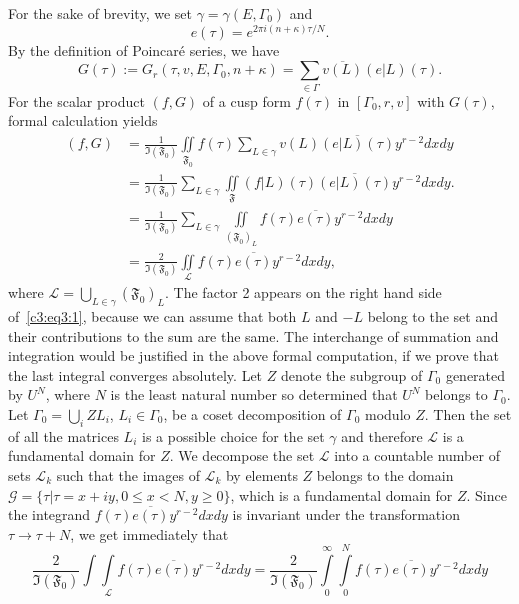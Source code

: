 For \pageoriginale the sake of brevity, we set
$\gamma=\gamma(E,\Gamma_0)$ and 
$$
e(\tau) =e^{2\pi i(n+\kappa)\tau/N}.
$$
By the definition of Poincar\'e series, we have 
$$
G(\tau):=G_r(\tau,v,E,\Gamma_0,n+\kappa) = \sum_{\in \Gamma}
\overline{v(L)} (e|L)(\tau).
$$
For the scalar product $(f,G)$ of a cusp form $f(\tau)$ in
$[\Gamma_0,r,v]$ with $G(\tau)$, formal calculation yields
\begin{align*}
(f,G) & = \frac{1}{\mathfrak{I}(\mathfrak{F}_0)}
 \iint\limits_{\mathfrak{F}_0} f(\tau) \sum_{L\in \gamma}
v(L) \overline{(e|L)(\tau)} y^{r-2} dx dy\\
& = \frac{1}{\mathfrak{I}(\mathfrak{F}_0)} \sum_{L\in \gamma}
 \iint\limits_{\mathfrak{F}} (f|L)(\tau) \overline{(e|L)(\tau)}
 y^{r-2} dx dy.\\
& = \frac{1}{\mathfrak{I}(\mathfrak{F}_0)} \sum_{L\in \gamma}
  \iint\limits_{(\mathfrak{F}_0)_L} f(\tau) \overline{e(\tau)}
  y^{r-2} dx dy\\
& = \frac{2}{\mathfrak{I}(\mathfrak{F}_0)}
  \iint\limits_{\mathscr{L}} f(\tau) \overline{e(\tau)} y^{r-2} dx
  dy, \tag{1}\label{c3:eq3:1}
\end{align*}
where
$\mathscr{L}=\bigcup\limits_{L\in\gamma}(\mathfrak{F}_0)_L$. The
factor 2 appears on the right hand side of~\eqref{c3:eq3:1}, because we can assume
that both $L$ and $-L$ belong to the set and their contributions to
the sum are the same. The interchange of summation and integration
would be justified in the above formal computation, if we prove that
the last integral converges absolutely. Let $Z$ denote the subgroup of
$\Gamma_0$ generated by $U^N$, where $N$ is the least natural number
so determined that $U^N$ belongs to $\Gamma_0$. Let
$\Gamma_0=\bigcup_i ZL_i$, $L_i\in \Gamma_0$, be a coset
decomposition of $\Gamma_0$ modulo $Z$. Then the set of all the
matrices $L_i$ is a possible choice for the set $\gamma$ and therefore
$\mathscr{L}$ is a fundamental \pageoriginale domain for $Z$. We
decompose the set $\mathscr{L}$ into a countable number of sets
$\mathscr{L}_k$ such that the images of $\mathscr{L}_k$ by elements
$Z$ belongs to the domain $\mathscr{G}=\{\tau|\tau=x+iy, 0\leq x < N,
y\geq 0\}$, which is a fundamental domain for $Z$. Since the integrand
$f(\tau) \overline{e(\tau)}y^{r-2}dxdy$ is invariant under the
transformation $\tau\to\tau+N$, we get immediately that 
\begin{equation*}
\frac{2}{\mathfrak{I}(\mathfrak{F}_0)} \int\int\limits_{\mathscr{L}}
f(\tau) \overline{e(\tau)} y^{r-2} dx dy = \frac{2}{\mathfrak{I}
  (\mathfrak{F}_0)} \int\limits^{\infty}_0 \int\limits^N_0 f(\tau)
\overline{e(\tau)} y^{r-2} dx dy \tag{2}\label{c3:eq3:2}
\end{equation*}
